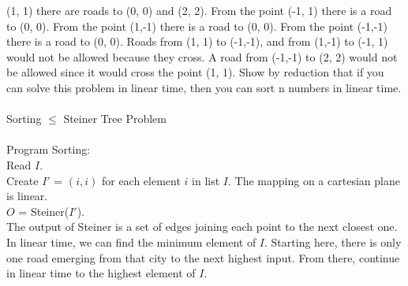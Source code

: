\documentclass[10pt]{article}
\newcommand{\tab}{\hspace*{2em}}
\begin{document}
		(1, 1) there are roads to (0, 0) and (2, 2). From the point (-1, 1) there is a road to (0, 0). From the
		point (1,-1) there is a road to (0, 0). From the point (-1,-1) there is a road to (0, 0).
		Roads from (1, 1) to (-1,-1), and from (1,-1) to (-1, 1) would not be allowed because they cross. A
		road from (-1,-1) to (2, 2) would not be allowed since it would cross the point (1, 1).
		Show by reduction that if you can solve this problem in linear time, then you can sort n numbers in
		linear time.\\
		\\
		Sorting $\leq$ Steiner Tree Problem\\
		\\
		Program Sorting:\\
		\tab Read $I$.\\
		\tab Create $I\prime$ = $(i,i)$ for each element $i$ in list $I$. The mapping on a cartesian plane is linear.\\
		\tab $O$ = Steiner($I\prime$).\\
		\tab The output of Steiner is a set of edges joining each point to the next closest one.\\
		\tab In linear time, we can find the minimum element of $I$. Starting here, there is only one road
			emerging from that city to the next highest input. From there, continue in linear time to the
			highest element of $I$.
\end{document}
